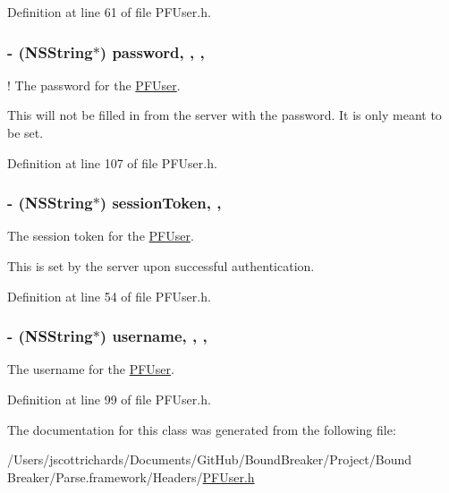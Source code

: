 Definition at line 61 of file P\+F\+User.\+h.

\hypertarget{interface_p_f_user_a58d5692efe283916b59aedd2944f92b8}{}
\subsubsection[{password}]{\setlength{\rightskip}{0pt plus 5cm}-\/ (N\+S\+String$\ast$) password\hspace{0.3cm}{\ttfamily [read]}, {\ttfamily [write]}, {\ttfamily [nonatomic]}, {\ttfamily [strong]}}\label{interface_p_f_user_a58d5692efe283916b59aedd2944f92b8}
!  The password for the {\ttfamily \hyperlink{interface_p_f_user}{P\+F\+User}}.

This will not be filled in from the server with the password. It is only meant to be set. 

Definition at line 107 of file P\+F\+User.\+h.

\hypertarget{interface_p_f_user_a1a33bcf3fb85e522f17cca78a800ee71}{}
\subsubsection[{session\+Token}]{\setlength{\rightskip}{0pt plus 5cm}-\/ (N\+S\+String$\ast$) session\+Token\hspace{0.3cm}{\ttfamily [read]}, {\ttfamily [nonatomic]}, {\ttfamily [copy]}}\label{interface_p_f_user_a1a33bcf3fb85e522f17cca78a800ee71}
The session token for the {\ttfamily \hyperlink{interface_p_f_user}{P\+F\+User}}.

This is set by the server upon successful authentication. 

Definition at line 54 of file P\+F\+User.\+h.

\hypertarget{interface_p_f_user_ac17cdae0f1b4c54a3603e035de9a163e}{}
\subsubsection[{username}]{\setlength{\rightskip}{0pt plus 5cm}-\/ (N\+S\+String$\ast$) username\hspace{0.3cm}{\ttfamily [read]}, {\ttfamily [write]}, {\ttfamily [nonatomic]}, {\ttfamily [strong]}}\label{interface_p_f_user_ac17cdae0f1b4c54a3603e035de9a163e}
The username for the {\ttfamily \hyperlink{interface_p_f_user}{P\+F\+User}}. 

Definition at line 99 of file P\+F\+User.\+h.



The documentation for this class was generated from the following file\+:\begin{DoxyCompactItemize}
\item 
/\+Users/jscottrichards/\+Documents/\+Git\+Hub/\+Bound\+Breaker/\+Project/\+Bound Breaker/\+Parse.\+framework/\+Headers/\hyperlink{_p_f_user_8h}{P\+F\+User.\+h}\end{DoxyCompactItemize}
